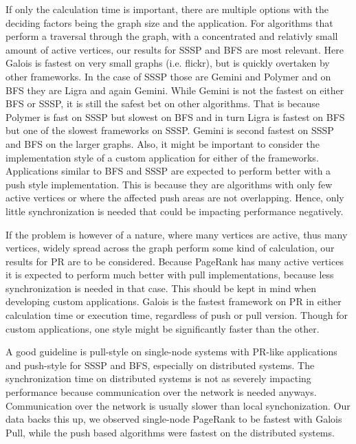If only the calculation time is important, there are multiple options with the deciding factors being the graph size and the application.
For algorithms that perform a traversal through the graph, with a concentrated and relativly small amount of active vertices, our results for SSSP and BFS are most relevant.
Here Galois is fastest on very small graphs (i.e. flickr), but is quickly overtaken by other frameworks.
In the case of SSSP those are Gemini and Polymer and on BFS they are Ligra and again Gemini. While Gemini is not the fastest on either BFS or SSSP, it is still the safest bet on other algorithms. That is because Polymer is fast on SSSP but slowest on BFS and in turn Ligra is fastest on BFS but one of the slowest frameworks on SSSP. Gemini is second fastest on SSSP and BFS on the larger graphs.
Also, it might be important to consider the implementation style of a custom application for either of the frameworks.
Applications similar to BFS and SSSP are expected to perform better with a push style implementation. 
This is because they are algorithms with only few active vertices or where the affected push areas are not overlapping. 
Hence, only little synchronization is needed that could be impacting performance negatively.

If the problem is however of a nature, where many vertices are active, thus many vertices, widely spread across the graph perform some kind of calculation, our results for PR are to be considered.
Because PageRank has many active vertices it is expected to perform much better with pull implementations, because less synchronization is needed in that case. This should be kept in mind when developing custom applications.
Galois is the fastest framework on PR in either calculation time or execution time, regardless of push or pull version. Though for custom applications, one style might be significantly faster than the other.

A good guideline is pull-style on single-node systems with PR-like applications and push-style for SSSP and BFS, especially on distributed systems.
The synchronization time on distributed systems is not as severely impacting performance because communication over the network is needed anyways. Communication over the network is usually slower than local synchonization.
Our data backs this up, we observed single-node PageRank to be fastest with Galois Pull, while the push based algorithms were fastest on the distributed systems.

